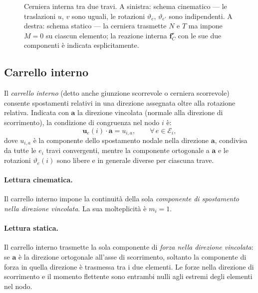 \begin{figure}[htbp]
	\centering
	\caption{Cerniera interna tra due travi. A sinistra:
		schema cinematico --- le traslazioni $u$, $v$
		sono uguali, le rotazioni $\vartheta_e$,
		$\vartheta_{e'}$ sono indipendenti.
		A destra: schema statico --- la cerniera
		trasmette $N$ e $T$ ma impone $M = 0$ su
		ciascun elemento; la reazione interna
		$\mathbf{f}_C^\mathscr{v}$ con le sue due
		componenti è indicata esplicitamente.}
	\label{fig:cerniera_interna}
\end{figure}


\subsection{Carrello interno}
\label{subsec:carrello_interno}

Il \emph{carrello interno} (detto anche giunzione
scorrevole o cerniera scorrevole) consente spostamenti
relativi in una direzione assegnata oltre alla
rotazione relativa. Indicata con $\bm{a}$ la direzione
vincolata (normale alla direzione di scorrimento),
la condizione di congruenza nel nodo $i$ è:
\begin{equation}\label{eq:cong_carrello_int}
	\mathbf{u}_e(i) \cdot \mathbf{a} = u_{i,a}, \qquad 
	\forall\, e \in \mathcal{E}_i,
\end{equation}
dove $u_{i,a}$ è la componente dello spostamento
nodale nella direzione $\mathbf{a}$, condivisa da tutte
le $e_i$ travi convergenti, mentre la componente
ortogonale a $\mathbf{a}$ e le rotazioni $\vartheta_e(i)$
sono libere e in generale diverse per ciascuna trave.

\paragraph{Lettura cinematica.}
Il carrello interno impone la continuità della sola
\emph{componente di spostamento nella direzione vincolata}.
La sua molteplicità è $m_i = 1$.

\paragraph{Lettura statica.}
Il carrello interno trasmette la sola componente
di \emph{forza nella direzione vincolata}: se $\bm{a}$
è la direzione ortogonale all'asse di scorrimento,
soltanto la componente di forza in quella direzione
è trasmessa tra i due elementi. Le forze nella direzione
di scorrimento e il momento flettente sono entrambi nulli
agli estremi degli elementi nel nodo.

